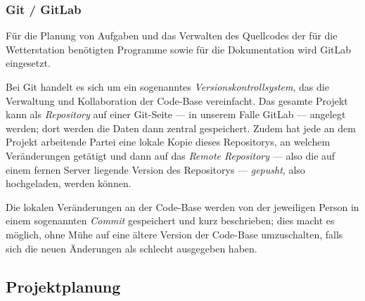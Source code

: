 \documentclass[a4paper,12pt]{article}
\begin{document}
\subsubsection{Git / GitLab}
Für die Planung von Aufgaben und das Verwalten des Quellcodes der für die Wetterstation benötigten Programme sowie für die Dokumentation wird GitLab eingesetzt.

Bei Git handelt es sich um ein sogenanntes \textit{Versionskontrollsystem}, das die Verwaltung und Kollaboration der Code-Base vereinfacht. 
Das gesamte Projekt kann als \textit{Repository} auf einer Git-Seite — in unserem Falle GitLab — angelegt werden; dort werden die Daten dann zentral gespeichert.
Zudem hat jede an dem Projekt arbeitende Partei eine lokale Kopie dieses Repositorys, an welchem Veränderungen getätigt und dann auf das \textit{Remote Repository} — also die auf einem fernen Server liegende Version des Repositorys — \textit{gepusht}, also hochgeladen, werden können.

Die lokalen Veränderungen an der Code-Base werden von der jeweiligen Person in einem sogenannten \textit{Commit} gespeichert und kurz beschrieben; dies macht es möglich, ohne Mühe auf eine ältere Version der Code-Base umzuschalten, falls sich die neuen Änderungen als schlecht ausgegeben haben.

\subsection{Projektplanung}
\end{document}
